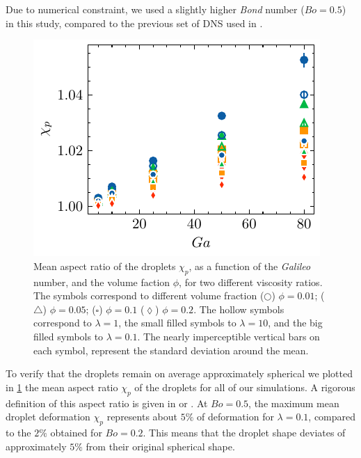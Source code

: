 Due to numerical constraint, we used a slightly higher \textit{Bond} number ($Bo = 0.5$) in this study, compared to the previous set of DNS used in \citet{fintzi2024buoyancy}. 
\begin{figure}[h!]
    \centering
    \includegraphics[height = 0.3\textwidth]{image/HOMOGENEOUS_final/PA/chi.pdf}
    \caption{Mean aspect ratio of the droplets $\chi_p$, as a function of the \textit{Galileo} number, and the volume faction $\phi$,  for two different viscosity ratios.  
    The symbols correspond to different volume fraction ($\pmb\bigcirc$) $\phi = 0.01$; ($\pmb\triangle$) $ \phi = 0.05$; ($\pmb\square$) $\phi = 0.1$ ($\pmb\lozenge$) $\phi = 0.2$.
    The hollow symbols correspond to $\lambda = 1$, the small filled symbols to $\lambda = 10$, and the big filled symbols to $\lambda = 0.1$.
    The nearly imperceptible vertical bars on each symbol, represent the standard deviation around the mean.  }
    \label{fig:chi2}
\end{figure}
To verify that the droplets remain on average approximately spherical we plotted in \ref{fig:chi2} the mean aspect ratio $\chi_p$ of the droplets for all of our simulations. 
A rigorous definition of this aspect ratio is given in \citet[Appendix 1]{fintzi2024buoyancy} or \citet{bunner2003effect}. 
At $Bo = 0.5$, the maximum mean droplet deformation $\chi_p$ represents about $5\%$ of deformation for $\lambda = 0.1$, compared to the $2\%$ obtained for $Bo = 0.2$. 
This means that the droplet shape deviates of approximately $5\%$ from their original spherical shape. 


